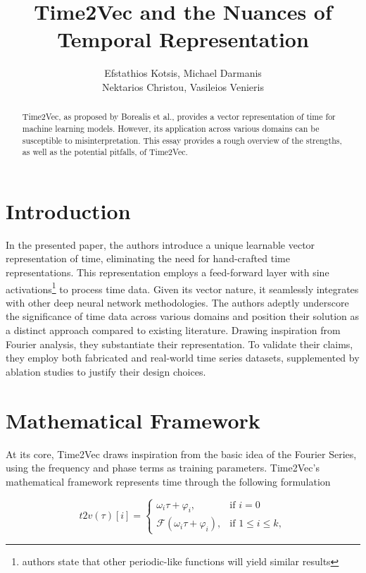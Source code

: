 \documentclass{tufte-handout}
\title{Time2Vec and the Nuances of Temporal Representation}
\author{Efstathios Kotsis, Michael Darmanis\\ Nektarios Christou, Vasileios Venieris
}
\begin{document}
\maketitle%
\vspace{12pt}

\begin{abstract}
Time2Vec, as proposed by Borealis et al.\cite{time2vec}, provides a vector representation of time for machine learning models. However, its application across various domains can be susceptible to misinterpretation. This essay provides a rough overview of the strengths, as well as the potential pitfalls, of Time2Vec.
\end{abstract}

\section{Introduction}

In the presented paper, the authors introduce a unique learnable vector representation of time, eliminating the need for hand-crafted time representations. This representation employs a feed-forward layer with sine activations\footnote{authors state that other periodic-like functions will yield similar results} to process time data. Given its vector nature, it seamlessly integrates with other deep neural network methodologies. The authors adeptly underscore the significance of time data across various domains and position their solution as a distinct approach compared to existing literature. Drawing inspiration from Fourier analysis, they substantiate their representation. To validate their claims, they employ both fabricated and real-world time series datasets, supplemented by ablation studies to justify their design choices.

\section{Mathematical Framework}

At its core, Time2Vec draws inspiration from the basic idea of the Fourier Series, using the frequency and phase terms as training parameters. Time2Vec's mathematical framework represents time through the following formulation

\[
t2v(\tau)[i] = 
\begin{cases} 
\omega_i \tau + \varphi_i, & \text{if } i = 0 \\
\mathcal{F}(\omega_i \tau + \varphi_i), & \text{if } 1 \leq i \leq k,
\end{cases}
\]
\end{document}
